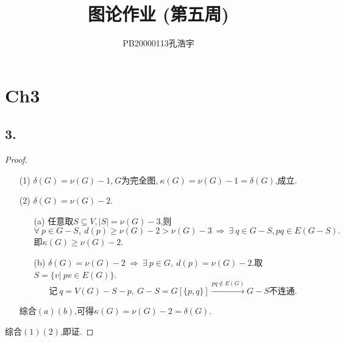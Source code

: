 \documentclass{article}
\title{图论作业 (第五周)}
\author{PB20000113孔浩宇}
\begin{document}
\maketitle
\section*{Ch3}
\subsection*{3.}
\begin{proof}
    \begin{enumerate}
        \item []
        \item [(1)]$\delta (G)=\nu (G)-1 $,$\ G$为完全图,$\ \kappa (G)=\nu (G)-1 =\delta (G)$,成立.
        \item [(2)]$\delta (G)=\nu (G)-2 $.
        \begin{enumerate}
            \item [(a)]任意取$S\subseteq V,|S|=\nu(G)-3$,则
            \[
                \forall\ p\in G-S,\ d(p)\geq \nu (G)-2>\nu (G)-3\ 
                \Rightarrow\ 
                \exists\ q\in G-S,pq\in E(G-S).
            \]
            即$\kappa (G)\geq \nu (G) -2$.
            \item [(b)]$\delta (G)=\nu (G)-2\ \Rightarrow\ \exists\ p\in G,\ d(p)=\nu(G)-2$.取$S=\{v|\ pv\in E(G)\}$.
            \[
                \mbox{记}\ q=V(G)-S-p,\ G-S=G[\{p,q\}]\xrightarrow{pq\notin E(G)} G-S\mbox{不连通}.
            \]
        \end{enumerate}
        综合$(a)(b)$,可得$\kappa (G)=\nu(G)-2=\delta(G)$.
    \end{enumerate}
    综合$(1)(2)$,即证.
\end{proof}
\end{document}
